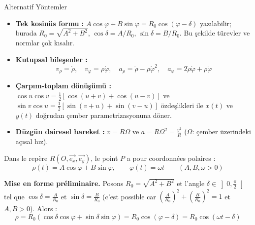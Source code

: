 \documentclass[11pt,a4paper]{article}
\begin{document}
\begin{theoriebox}{Alternatif Yöntemler}
\begin{itemize}
    \item \textbf{Tek kosinüs formu :} $A\cos\varphi + B\sin\varphi = R_0\cos(\varphi-\delta)$ yazılabilir; burada $R_0=\sqrt{A^2+B^2}$, $\cos\delta = A/R_0$, $\sin\delta = B/R_0$. Bu şekilde türevler ve normlar çok kısalır.
    \item \textbf{Kutupsal bileşenler :}
    $$ v_\rho = \dot\rho,\quad v_\varphi = \rho\dot\varphi,\quad a_\rho = \ddot\rho - \rho\dot\varphi^2,\quad a_\varphi = 2\dot\rho\dot\varphi + \rho\ddot\varphi $$
    \item \textbf{Çarpım-toplam dönüşümü :} $\cos u\cos v=\frac12\left[\cos(u+v)+\cos(u-v)\right]$ ve $\sin v\cos u = \frac12\left[\sin(v+u)+\sin(v-u)\right]$ özdeşlikleri ile $x(t)$ ve $y(t)$ doğrudan çember parametrizasyonuna döner.
    \item \textbf{Düzgün dairesel hareket :} $v=R\Omega$ ve $a=R\Omega^2=\frac{v^2}{R}$ ($\Omega$: çember üzerindeki açısal hız).
\end{itemize}
\end{theoriebox}

Dans le repère $R(O,\vec{e_x},\vec{e_y})$, le point $P$ a pour coordonnées polaires :
$$ \rho(t) = A\cos\varphi + B\sin\varphi, \qquad \varphi(t) = \omega t \qquad (A,B,\omega>0) $$

\textbf{Mise en forme préliminaire.} Posons $R_0 = \sqrt{A^2+B^2}$ et l'angle $\delta\in\left]0,\frac{\pi}{2}\right[$ tel que $\cos\delta = \frac{A}{R_0}$ et $\sin\delta = \frac{B}{R_0}$ (c'est possible car $\left(\frac{A}{R_0}\right)^2 + \left(\frac{B}{R_0}\right)^2 = 1$ et $A,B>0$). Alors :
$$ \rho = R_0\left(\cos\delta\cos\varphi + \sin\delta\sin\varphi\right) = R_0\cos(\varphi - \delta) = R_0\cos(\omega t - \delta) $$
\end{document}
